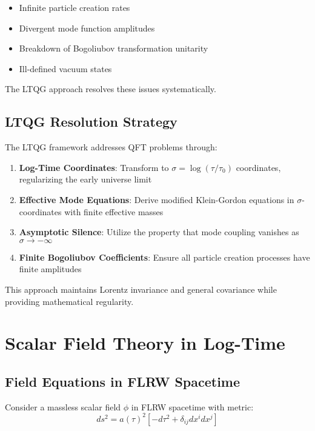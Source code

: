 \documentclass[11pt,a4paper]{article}
\begin{document}
\begin{itemize}
\item Infinite particle creation rates
\item Divergent mode function amplitudes  
\item Breakdown of Bogoliubov transformation unitarity
\item Ill-defined vacuum states
\end{itemize}

The LTQG approach resolves these issues systematically.

\subsection{LTQG Resolution Strategy}

The LTQG framework addresses QFT problems through:

\begin{enumerate}
\item \textbf{Log-Time Coordinates}: Transform to $\sigma = \log(\tau/\tau_0)$ coordinates, regularizing the early universe limit

\item \textbf{Effective Mode Equations}: Derive modified Klein-Gordon equations in $\sigma$-coordinates with finite effective masses

\item \textbf{Asymptotic Silence}: Utilize the property that mode coupling vanishes as $\sigma \to -\infty$

\item \textbf{Finite Bogoliubov Coefficients}: Ensure all particle creation processes have finite amplitudes
\end{enumerate}

This approach maintains Lorentz invariance and general covariance while providing mathematical regularity.

\section{Scalar Field Theory in Log-Time}

\subsection{Field Equations in FLRW Spacetime}

Consider a massless scalar field $\phi$ in FLRW spacetime with metric:
\begin{equation}
ds^2 = a(\tau)^2 \left[-d\tau^2 + \delta_{ij} dx^i dx^j\right]
\end{equation}
\end{document}
